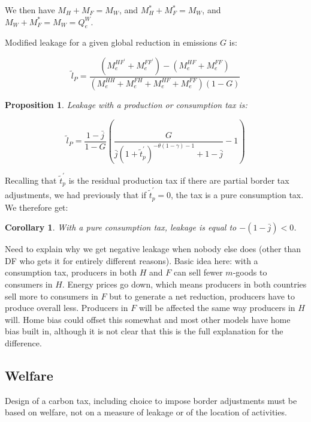 \documentclass[notitlepage,12pt]{article}
\newtheorem{corollary}[theorem]{Corollary}
\newtheorem{proposition}[theorem]{Proposition}
\begin{document}
We then have $M_{H}+M_{F}=M_{W}$, and $M_{H}^{\ast }+M_{F}^{\ast }=M_{W}$,
and $M_{W}+M_{F}^{\ast }=M_{W}=Q_{e}^{W}$.

Modified leakage for a given global reduction in emissions $G$ is:\ 

\begin{equation*}
\tilde{l}_{P}=\frac{\left( M_{e}^{HF^{\prime }}+M_{e}^{FF^{\prime }}\right)
-\left( M_{e}^{HF}+M_{e}^{FF}\right) }{\left(
M_{e}^{HH}+M_{e}^{FH}+M_{e}^{HF}+M_{e}^{FF}\right) \left( 1-G\right) }
\end{equation*}

\begin{proposition}
Leakage with a production or consumption tax is:
\end{proposition}

\begin{equation*}
\tilde{l}_{P}=\frac{1-\bar{j}}{1-G}\left( \frac{G}{\bar{j}\left( 1+\tilde{t}%
_{p}^{\prime }\right) ^{-\theta \left( 1-\gamma \right) -1}+1-\bar{j}}%
-1\right)
\end{equation*}

Recalling that $\tilde{t}_{p}^{\prime }$ is the residual production tax if
there are partial border tax adjustments, we had previously that if $\tilde{t%
}_{p}^{\prime }=0$, the tax is a pure consumption tax. We therefore get:

\begin{corollary}
With a pure consumption tax, leakage is equal to $-\left( 1-\bar{j}\right)
<0 $.
\end{corollary}

Need to explain why we get negative leakage when nobody else does (other
than DF who gets it for entirely different reasons). Basic idea here: with a
consumption tax, producers in both $H$ and $F$ can sell fewer $m$-goods to
consumers in $H$. Energy prices go down, which means producers in both
countries sell more to consumers in $F$ but to generate a net reduction,
producers have to produce overall less. Producers in $F$ will be affected
the same way producers in $H$ will. Home bias could offset this somewhat and
most other models have home bias built in, although it is not clear that
this is the full explanation for the difference.

\subsection{Welfare\newline
}

Design of a carbon tax, including choice to impose border adjustments must
be based on welfare, not on a measure of leakage or of the location of
activities.
\end{document}
